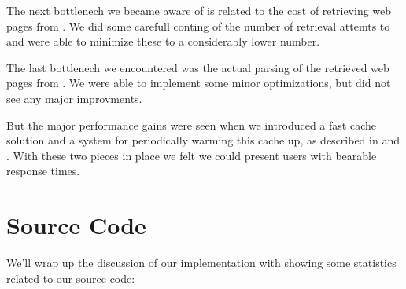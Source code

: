 
The next bottlenech we became aware of is related to the cost of retrieving
web pages from \urort{}. We did some carefull conting of the number of
retrieval attemts to \urort{} and were able to minimize these to a
considerably lower number.

The last bottlenech we encountered was the actual parsing of the retrieved web
pages from \urort{}. We were able to implement some minor optimizations, but
did not see any major improvments.

But the major performance gains were seen when we introduced a fast cache
solution and a system for periodically warming this cache up,
as described in
 and
.
With these two pieces in place we felt we could present users with bearable
response times.

\section{Source Code}
\label{section:implementation.source.code}

We'll wrap up the discussion of our implementation with showing some
statistics related to our source code:

